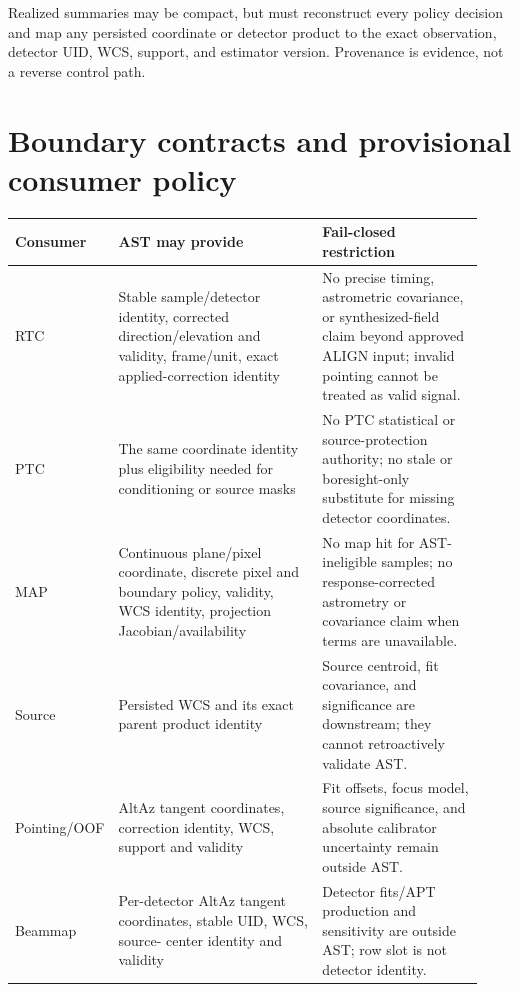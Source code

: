 \documentclass[11pt]{article}
\begin{document}
Realized summaries may be compact, but must reconstruct every policy decision
and map any persisted coordinate or detector product to the exact observation,
detector UID, WCS, support, and estimator version.  Provenance is evidence, not
a reverse control path.

\section{Boundary contracts and provisional consumer policy}

\begin{longtable}{>{\raggedright\arraybackslash}p{0.14\linewidth}
                  >{\raggedright\arraybackslash}p{0.44\linewidth}
                  >{\raggedright\arraybackslash}p{0.35\linewidth}}
\toprule
Consumer & AST may provide & Fail-closed restriction \\
\midrule
\endhead
RTC & Stable sample/detector identity, corrected direction/elevation and
validity, frame/unit, exact applied-correction identity & No precise timing,
astrometric covariance, or synthesized-field claim beyond approved ALIGN
input; invalid pointing cannot be treated as valid signal. \\
PTC & The same coordinate identity plus eligibility needed for conditioning
or source masks & No PTC statistical or source-protection authority; no stale
or boresight-only substitute for missing detector coordinates. \\
MAP & Continuous plane/pixel coordinate, discrete pixel and boundary policy,
validity, WCS identity, projection Jacobian/availability & No map hit for AST-
ineligible samples; no response-corrected astrometry or covariance claim when
terms are unavailable. \\
Source & Persisted WCS and its exact parent product identity & Source centroid,
fit covariance, and significance are downstream; they cannot retroactively
validate AST. \\
Pointing/OOF & AltAz tangent coordinates, correction identity, WCS, support and
validity & Fit offsets, focus model, source significance, and absolute
calibrator uncertainty remain outside AST. \\
Beammap & Per-detector AltAz tangent coordinates, stable UID, WCS, source-
center identity and validity & Detector fits/APT production and sensitivity
are outside AST; row slot is not detector identity. \\
\bottomrule
\end{longtable}
\end{document}
